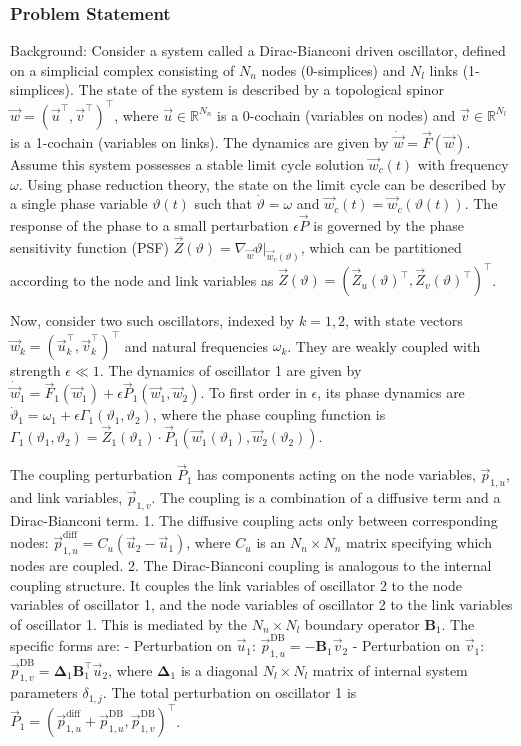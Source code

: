 \documentclass[10pt]{article}
\begin{document}
\subsubsection*{Problem Statement}
Background:
Consider a system called a Dirac-Bianconi driven oscillator, defined on a simplicial complex consisting of $N_n$ nodes (0-simplices) and $N_l$ links (1-simplices). The state of the system is described by a topological spinor $\vec{w} = (\vec{u}^\top, \vec{v}^\top)^\top$, where $\vec{u} \in \mathbb{R}^{N_n}$ is a 0-cochain (variables on nodes) and $\vec{v} \in \mathbb{R}^{N_l}$ is a 1-cochain (variables on links). The dynamics are given by $\dot{\vec{w}} = \vec{F}(\vec{w})$. Assume this system possesses a stable limit cycle solution $\vec{w}_c(t)$ with frequency $\omega$. Using phase reduction theory, the state on the limit cycle can be described by a single phase variable $\vartheta(t)$ such that $\dot{\vartheta} = \omega$ and $\vec{w}_c(t) = \vec{w}_c(\vartheta(t))$. The response of the phase to a small perturbation $\epsilon \vec{P}$ is governed by the phase sensitivity function (PSF) $\vec{Z}(\vartheta) = \nabla_{\vec{w}} \vartheta |_{\vec{w}_c(\vartheta)}$, which can be partitioned according to the node and link variables as $\vec{Z}(\vartheta) = (\vec{Z}_u(\vartheta)^\top, \vec{Z}_v(\vartheta)^\top)^\top$.

Now, consider two such oscillators, indexed by $k=1,2$, with state vectors $\vec{w}_k = (\vec{u}_k^\top, \vec{v}_k^\top)^\top$ and natural frequencies $\omega_k$. They are weakly coupled with strength $\epsilon \ll 1$. The dynamics of oscillator 1 are given by $\dot{\vec{w}}_1 = \vec{F}_1(\vec{w}_1) + \epsilon \vec{P}_1(\vec{w}_1, \vec{w}_2)$. To first order in $\epsilon$, its phase dynamics are $\dot{\vartheta}_1 = \omega_1 + \epsilon \Gamma_1(\vartheta_1, \vartheta_2)$, where the phase coupling function is $\Gamma_1(\vartheta_1, \vartheta_2) = \vec{Z}_1(\vartheta_1) \cdot \vec{P}_1(\vec{w}_1(\vartheta_1), \vec{w}_2(\vartheta_2))$.

The coupling perturbation $\vec{P}_1$ has components acting on the node variables, $\vec{p}_{1,u}$, and link variables, $\vec{p}_{1,v}$. The coupling is a combination of a diffusive term and a Dirac-Bianconi term.
1. The diffusive coupling acts only between corresponding nodes: $\vec{p}_{1,u}^{\text{diff}} = C_u(\vec{u}_2 - \vec{u}_1)$, where $C_u$ is an $N_n \times N_n$ matrix specifying which nodes are coupled.
2. The Dirac-Bianconi coupling is analogous to the internal coupling structure. It couples the link variables of oscillator 2 to the node variables of oscillator 1, and the node variables of oscillator 2 to the link variables of oscillator 1. This is mediated by the $N_n \times N_l$ boundary operator $\boldsymbol{B}_1$. The specific forms are:
   - Perturbation on $\vec{u}_1$: $\vec{p}_{1,u}^{\text{DB}} = - \boldsymbol{B}_1 \vec{v}_2$
   - Perturbation on $\vec{v}_1$: $\vec{p}_{1,v}^{\text{DB}} = \boldsymbol{\Delta}_1 \boldsymbol{B}_1^\top \vec{u}_2$, where $\boldsymbol{\Delta}_1$ is a diagonal $N_l \times N_l$ matrix of internal system parameters $\delta_{1,j}$.
The total perturbation on oscillator 1 is $\vec{P}_1 = (\vec{p}_{1,u}^{\text{diff}} + \vec{p}_{1,u}^{\text{DB}}, \vec{p}_{1,v}^{\text{DB}})^\top$.
\end{document}
